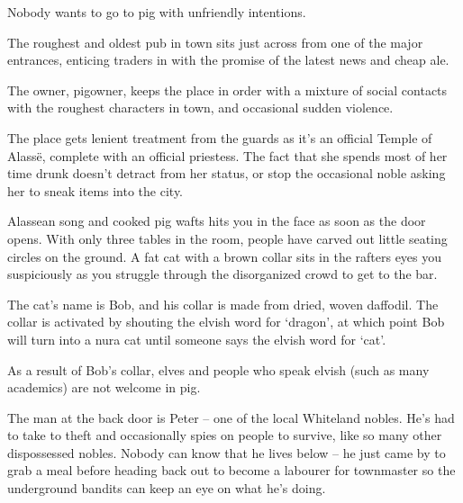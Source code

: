 \begin{multicols}{2}
\begin{boxtext}
Nobody wants to go to \gls{pig} with unfriendly intentions.

\end{boxtext}
 
The roughest and oldest pub in town sits just across from one of the major entrances, enticing traders in with the promise of the latest news and cheap ale.

The owner, \gls{pigowner}, keeps the place in order with a mixture of social contacts with the roughest characters in town, and occasional sudden violence.

The place gets lenient treatment from the guards as it's an official Temple of Alass\"{e}, complete with an official priestess.
The fact that she spends most of her time drunk doesn't detract from her status, or stop the occasional noble asking her to sneak items into the city.

\begin{table*}[t]

\label{mincing_pig_map}

\end{table*}


\begin{boxtext}

	Alassean song and cooked pig wafts hits you in the face as soon as the door opens.  With only three tables in the room, people have carved out little seating circles on the ground.  A fat cat with a brown collar sits in the rafters eyes you suspiciously as you struggle through the disorganized crowd to get to the bar.

\end{boxtext}

The cat's name is Bob, and his collar is made from dried, woven daffodil.  The collar is activated by shouting the elvish word for `dragon', at which point Bob will turn into a nura cat until someone says the elvish word for `cat'.

As a result of Bob's collar, elves and people who speak elvish (such as many academics) are not welcome in \gls{pig}.



The man at the back door is Peter -- one of the local Whiteland nobles. He's had to take to theft and occasionally spies on people to survive, like so many other dispossessed nobles.  Nobody can know that he lives below -- he just came by to grab a meal before heading back out to become a labourer for \gls{townmaster} so the underground bandits can keep an eye on what he's doing.


\end{multicols}
